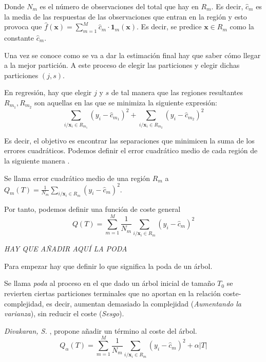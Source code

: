 \noindent Donde $N_m$ es el número de observaciones del total que hay en $R_m$. Es decir, $\hat{c}_m$ es la media de las respuestas de las observaciones que entran en la región y esto provoca que $\hat{f}(\mathbf{x})=\sum_{m=1}^M \hat{c}_m \cdot \mathbf{1}_m(\mathbf{x})$. Es decir, se predice $\mathbf{x}\in R_m$ como la constante $\hat{c}_m$. \cite{Hastie 2001}

\noindent Una vez se conoce como se va a dar la estimación final hay que saber cómo llegar a la mejor partición. A este proceso de elegir las particiones y elegir dichas particiones $(j,s)$. 

\noindent En regresión, hay que elegir $j$ y $s$ de tal manera que las regiones resultantes $R_{m_1},R_{m_2}$ son aquellas en las que se minimiza la siguiente expresión:
\begin{equation}
\sum_{i/\mathbf{x}_i\in R_{m_1} } (y_i-\hat{c}_{m_1})^2+\sum_{i/\mathbf{x}_i\in R_{m_2} } (y_i-\hat{c}_{m_2})^2
\end{equation}

\noindent Es decir, el objetivo es encontrar las separaciones que minimicen la suma de los errores cuadráticos. Podemos definir el error cuadrático medio de cada región de la siguiente manera \cite{Hastie 2001}.

\begin{defi}
Se llama error cuadrático medio de una región $R_m$ a $Q_m(T)=\frac{1}{N_m}\sum_{i/\mathbf{x}_i\in R_m}(y_i-\hat{c}_m)^2$.
\end{defi}

\noindent Por tanto, podemos definir una función de coste general 
\begin{equation}
Q(T)=\sum_{m=1}^M\frac{1}{N_m}\sum_{i/\mathbf{x}_i\in R_m} (y_i-\hat{c}_m)^2
\end{equation}

\noindent \emph{HAY QUE AÑADIR AQUÍ LA PODA} 

\noindent Para empezar hay que definir lo que significa la poda de un árbol. 
\begin{defi}
Se llama \emph{poda} al proceso en el que dado un árbol inicial de tamaño $T_0$ se revierten ciertas particiones terminales que no aportan en la relación coste-complejidad, es decir, aumentan demasiado la complejidad (\emph{Aumentando la varianza}), sin reducir el coste (\emph{Sesgo}).
\end{defi}

\noindent \emph{Divakaran, S. }\cite{Divakaran 2022}, propone añadir un término al coste del árbol. 
\begin{equation}
Q_{\alpha}(T)=\sum_{m=1}^M\frac{1}{N_m}\sum_{i/\mathbf{x}_i\in R_m} (y_i-\hat{c}_m)^2+\alpha|T |
\end{equation}

